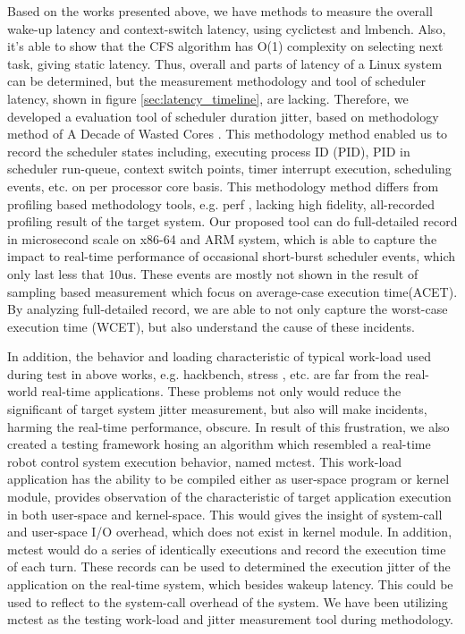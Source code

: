 \documentclass[conference]{IEEEtran}
\begin{document}
    Based on the works presented above, we have methods to measure the overall wake-up latency and context-switch
    latency, using cyclictest and lmbench. Also, it's able to show that the CFS algorithm has O(1) complexity on
    selecting next task, giving static latency. Thus, overall  and parts of latency of a Linux system can be determined,
    but the measurement methodology and tool of scheduler latency, shown in figure \ref{sec:latency_timeline}, are
    lacking. Therefore, we developed a evaluation tool of scheduler duration jitter, based on methodology method of A
    Decade of Wasted Cores \cite{Lozi:2016:LSD:2901318.2901326}. This methodology method enabled us to record the
    scheduler states including, executing process ID (PID), PID in scheduler run-queue, context switch points, timer
    interrupt execution, scheduling events, etc. on per processor core basis. This methodology method differs from
    profiling based methodology tools, e.g. perf \cite{perf}, lacking high fidelity, all-recorded profiling result of
    the target system. Our proposed tool can do full-detailed record in microsecond scale on x86-64 and ARM system,
    which is able to capture the impact to real-time performance of occasional short-burst scheduler events, which only
    last less that 10us. These events are mostly not shown in the result of sampling based measurement which focus on
    average-case execution time(ACET). By analyzing full-detailed record, we are able to not only capture the worst-case
    execution time (WCET), but also understand the cause of these incidents.

    In addition, the behavior and loading characteristic of typical work-load used during test in above works, e.g.
    hackbench, stress \cite{rt-tests}, etc. are far from the real-world real-time applications. These problems not only
    would reduce the significant of target system jitter measurement, but also will make incidents, harming the
    real-time performance, obscure. In result of this frustration, we also created a testing framework hosing an
    algorithm which resembled a real-time robot control system execution behavior, named mctest. This work-load
    application has the ability to be compiled either as user-space program or kernel module, provides observation of
    the characteristic of target application execution in both user-space and kernel-space. This would gives the insight
    of system-call and user-space I/O overhead, which does not exist in kernel module. In addition, mctest would do a
    series of identically executions and record the execution time of each turn. These records can be used to determined
    the execution jitter of the application on the real-time system, which besides wakeup latency. This could be used to
    reflect to the system-call overhead of the system. We have been utilizing mctest as the testing work-load and jitter
    measurement tool during methodology.
\end{document}
